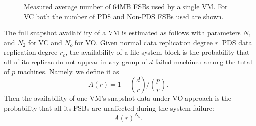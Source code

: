 \begin{figure}[htbp]
  \centering
  \caption{Measured average number of 64MB FSBs used by a single VM. For VC both the number of PDS and Non-PDS FSBs used are shown.}
  \label{fig:vm-links}
\end{figure}

The full snapshot availability of a VM is estimated as follows with parameters $N_1$ and
 $N_2$ for VC and $N_o$ for VO.
Given normal data replication degree $r$, PDS data replication degree $r_c$, 
the availability of a file system block is the probability that  
all of its replicas do not appear in any group of $d$ failed machines among the total of $p$ machines. 
Namely, we define it as
\[
A(r) = 1-\binom{d}{r}/ \binom{p}{r}. 
\]
Then the availability of one VM's snapshot data under VO approach is the probability that
 all its FSBs are unaffected during the system failure:
\[
A(r)^{N_o}. 
\]

